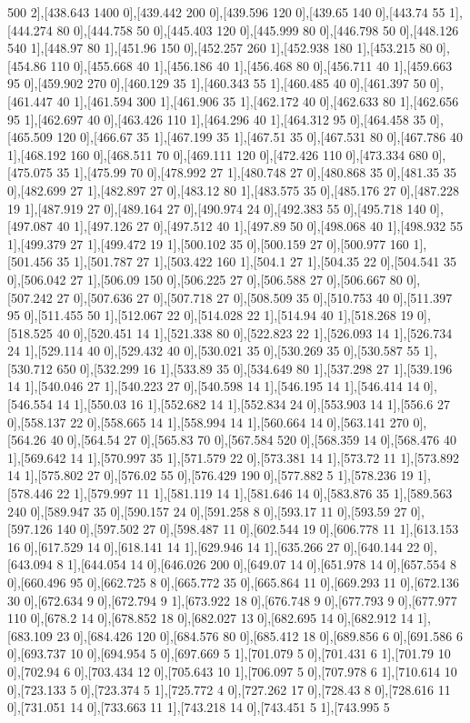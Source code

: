 {500 2],[438.643 1400 0],[439.442 200 0],[439.596 120 0],[439.65 140 0],[443.74 55 1],[444.274 80 0],[444.758 50 0],[445.403 120 0],[445.999 80 0],[446.798 50 0],[448.126 540 1],[448.97 80 1],[451.96 150 0],[452.257 260 1],[452.938 180 1],[453.215 80 0],[454.86 110 0],[455.668 40 1],[456.186 40 1],[456.468 80 0],[456.711 40 1],[459.663 95 0],[459.902 270 0],[460.129 35 1],[460.343 55 1],[460.485 40 0],[461.397 50 0],[461.447 40 1],[461.594 300 1],[461.906 35 1],[462.172 40 0],[462.633 80 1],[462.656 95 1],[462.697 40 0],[463.426 110 1],[464.296 40 1],[464.312 95 0],[464.458 35 0],[465.509 120 0],[466.67 35 1],[467.199 35 1],[467.51 35 0],[467.531 80 0],[467.786 40 1],[468.192 160 0],[468.511 70 0],[469.111 120 0],[472.426 110 0],[473.334 680 0],[475.075 35 1],[475.99 70 0],[478.992 27 1],[480.748 27 0],[480.868 35 0],[481.35 35 0],[482.699 27 1],[482.897 27 0],[483.12 80 1],[483.575 35 0],[485.176 27 0],[487.228 19 1],[487.919 27 0],[489.164 27 0],[490.974 24 0],[492.383 55 0],[495.718 140 0],[497.087 40 1],[497.126 27 0],[497.512 40 1],[497.89 50 0],[498.068 40 1],[498.932 55 1],[499.379 27 1],[499.472 19 1],[500.102 35 0],[500.159 27 0],[500.977 160 1],[501.456 35 1],[501.787 27 1],[503.422 160 1],[504.1 27 1],[504.35 22 0],[504.541 35 0],[506.042 27 1],[506.09 150 0],[506.225 27 0],[506.588 27 0],[506.667 80 0],[507.242 27 0],[507.636 27 0],[507.718 27 0],[508.509 35 0],[510.753 40 0],[511.397 95 0],[511.455 50 1],[512.067 22 0],[514.028 22 1],[514.94 40 1],[518.268 19 0],[518.525 40 0],[520.451 14 1],[521.338 80 0],[522.823 22 1],[526.093 14 1],[526.734 24 1],[529.114 40 0],[529.432 40 0],[530.021 35 0],[530.269 35 0],[530.587 55 1],[530.712 650 0],[532.299 16 1],[533.89 35 0],[534.649 80 1],[537.298 27 1],[539.196 14 1],[540.046 27 1],[540.223 27 0],[540.598 14 1],[546.195 14 1],[546.414 14 0],[546.554 14 1],[550.03 16 1],[552.682 14 1],[552.834 24 0],[553.903 14 1],[556.6 27 0],[558.137 22 0],[558.665 14 1],[558.994 14 1],[560.664 14 0],[563.141 270 0],[564.26 40 0],[564.54 27 0],[565.83 70 0],[567.584 520 0],[568.359 14 0],[568.476 40 1],[569.642 14 1],[570.997 35 1],[571.579 22 0],[573.381 14 1],[573.72 11 1],[573.892 14 1],[575.802 27 0],[576.02 55 0],[576.429 190 0],[577.882 5 1],[578.236 19 1],[578.446 22 1],[579.997 11 1],[581.119 14 1],[581.646 14 0],[583.876 35 1],[589.563 240 0],[589.947 35 0],[590.157 24 0],[591.258 8 0],[593.17 11 0],[593.59 27 0],[597.126 140 0],[597.502 27 0],[598.487 11 0],[602.544 19 0],[606.778 11 1],[613.153 16 0],[617.529 14 0],[618.141 14 1],[629.946 14 1],[635.266 27 0],[640.144 22 0],[643.094 8 1],[644.054 14 0],[646.026 200 0],[649.07 14 0],[651.978 14 0],[657.554 8 0],[660.496 95 0],[662.725 8 0],[665.772 35 0],[665.864 11 0],[669.293 11 0],[672.136 30 0],[672.634 9 0],[672.794 9 1],[673.922 18 0],[676.748 9 0],[677.793 9 0],[677.977 110 0],[678.2 14 0],[678.852 18 0],[682.027 13 0],[682.695 14 0],[682.912 14 1],[683.109 23 0],[684.426 120 0],[684.576 80 0],[685.412 18 0],[689.856 6 0],[691.586 6 0],[693.737 10 0],[694.954 5 0],[697.669 5 1],[701.079 5 0],[701.431 6 1],[701.79 10 0],[702.94 6 0],[703.434 12 0],[705.643 10 1],[706.097 5 0],[707.978 6 1],[710.614 10 0],[723.133 5 0],[723.374 5 1],[725.772 4 0],[727.262 17 0],[728.43 8 0],[728.616 11 0],[731.051 14 0],[733.663 11 1],[743.218 14 0],[743.451 5 1],[743.995 5 }
